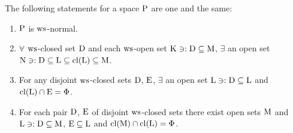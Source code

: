 \begin{thm}\label{thm8.4.9}
The following statements for a space $\mathrm{P}$ are one and the same:
\begin{enumerate}[(1)]
\item $\mathrm{P}$ is $\mathrm{ws}$-normal.
\item $\forall$ $\mathrm{ws}$-closed set $\mathrm{D}$ and each $\mathrm{ws}$-open set $\mathrm{K} \ni: \mathrm{D} \subseteq \mathrm{M}$, $\exists$ an open set $\mathrm{N} \ni: \mathrm{D} \subseteq \mathrm{L} \subseteq \mathrm{cl}(\mathrm{L}) \subseteq \mathrm{M}$.
\item For any disjoint $\mathrm{ws}$-closed sets $\mathrm{D}$, $\mathrm{E}$, $\exists$ an open set $\mathrm{L} \ni: \mathrm{D} \subseteq \mathrm{L}$ and $\mathrm{cl}(\mathrm{L}) \cap \mathrm{E} = \Phi$.
\item For each pair $\mathrm{D}$, $\mathrm{E}$ of disjoint $\mathrm{ws}$-closed sets there exist open sets $\mathrm{M}$ and $\mathrm{L} \ni: \mathrm{D} \subseteq \mathrm{M}$, $\mathrm{E} \subseteq \mathrm{L}$ and $\mathrm{cl}(\mathrm{M}) \cap \mathrm{cl}(\mathrm{L}) = \Phi$.
\end{enumerate}
\end{thm}

